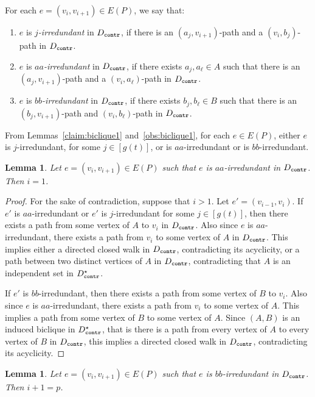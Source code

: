 \documentclass[a4paper,11pt]{article}
\theoremstyle{plain}
\newtheorem{lemma}[theorem]{Lemma}
\newtheorem{identification rule}{Identification Rule}
\theoremstyle{definition}
\theoremstyle{remark}
\newcommand{\contr}{\textnormal{\texttt{contr}}}
\newcommand{\Dcontr}{D_{\contr}}
\begin{document}
For each $e=(v_i,v_{i+1}) \in E(P)$, we say that:
\begin{enumerate}
\item $e$ is {\em $j$-irredundant} in $\Dcontr$, if there is an $(a_j,v_{i+1})$-path and a $(v_i,b_j)$-path in $\Dcontr$.
\item $e$ is {\em $aa$-irredundant} in $\Dcontr$, if there exists $a_j,a_{\ell} \in A$ such that there is an $(a_j,v_{i+1})$-path and a $(v_i,a_{\ell})$-path in $\Dcontr$.
\item  $e$ is {\em $bb$-irredundant} in $\Dcontr$, if there exists $b_j,b_{\ell} \in B$ such that there is an $(b_j,v_{i+1})$-path and $(v_i,b_{\ell})$-path in $\Dcontr$.
\end{enumerate}

From Lemmas~\ref{claim:biclique1} and~\ref{obs:biclique1}, for each $e \in E(P)$, either $e$ is $j$-irredundant, for some $j \in [g(t)]$, or is $aa$-irredundant or is $bb$-irredundant.

\begin{lemma}\label{claim:biclique21}
Let $e=(v_i,v_{i+1}) \in E(P)$ such that $e$ is $aa$-irredundant in $\Dcontr$. Then $i=1$.
\end{lemma}

\begin{proof}
For the sake of contradiction, suppose that $i>1$. Let $e'=(v_{i-1},v_i)$. 
If $e'$ is $aa$-irredundant or $e'$ is $j$-irredundant for some $j \in [g(t)]$, then there exists a path from some vertex of $A$ to $v_i$ in $\Dcontr$. Also since $e$ is $aa$-irredundant, there exists a path from $v_i$ to some vertex of $A$ in $\Dcontr$. This implies either a directed closed walk in $\Dcontr$, contradicting its acyclicity, or a path between two distinct vertices of $A$ in $\Dcontr$, contradicting that $A$ is an independent set in $\Dcontr^{\star}$.

If $e'$ is $bb$-irredundant, then there exists a path from some vertex of $B$ to $v_i$. Also since $e$ is $aa$-irredundant, there exists a path from $v_i$ to some vertex of $A$. This implies a path from some vertex of $B$ to some vertex of $A$. Since $(A,B)$ is an induced biclique in $\Dcontr^{\star}$, that is there is a path from every vertex of $A$ to every vertex of $B$ in $\Dcontr$, this implies a directed closed walk in $\Dcontr$, contradicting its acyclicity.
\end{proof}

\begin{lemma}\label{claim:biclique22}
Let $e=(v_i,v_{i+1}) \in E(P)$ such that $e$ is $bb$-irredundant in $\Dcontr$. Then $i+1=p$.
\end{lemma}
\end{document}
